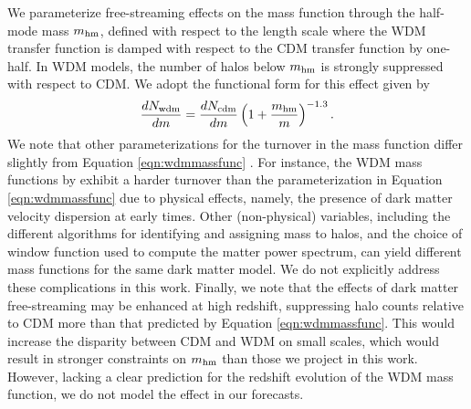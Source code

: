 We parameterize free-streaming effects on the mass function through the half-mode mass $m_{\rm{hm}}$, defined with respect to the length scale where the WDM transfer function is damped with respect to the CDM transfer function by one-half. In WDM models, the number of halos below $m_{\rm{hm}}$ is strongly suppressed with respect to CDM. We adopt the functional form for this effect given by \cite{Lovell++14}
\begin{equation}
\label{eqn:wdmmassfunc}
\frac{dN_{\rm{wdm}}}{dm} = \frac{dN_{\rm{cdm}}}{dm} \left(1+\frac{m_{\rm{hm}}}{m}\right)^{-1.3}.
\end{equation}
We note that other parameterizations for the turnover in the mass function differ slightly from Equation \ref{eqn:wdmmassfunc} \cite[see ][]{Schneider++12,Benson++13}. For instance, the WDM mass functions by \cite{Benson++13} exhibit a harder turnover than the parameterization in Equation \ref{eqn:wdmmassfunc} due to physical effects, namely, the presence of dark matter velocity dispersion at early times. Other (non-physical) variables, including the different algorithms for identifying and assigning mass to halos, and the choice of window function used to compute the matter power spectrum, can yield different mass functions for the same dark matter model. We do not explicitly address these complications in this work. Finally, we note that the effects of dark matter free-streaming may be enhanced at high redshift, suppressing halo counts relative to CDM more than that predicted by Equation \ref{eqn:wdmmassfunc}. This would increase the disparity between CDM and WDM on small scales, which would result in stronger constraints on ${m_{\rm{hm}}}$ than those we project in this work. However, lacking a clear prediction for the redshift evolution of the WDM mass function, we do not model the effect in our forecasts. 

